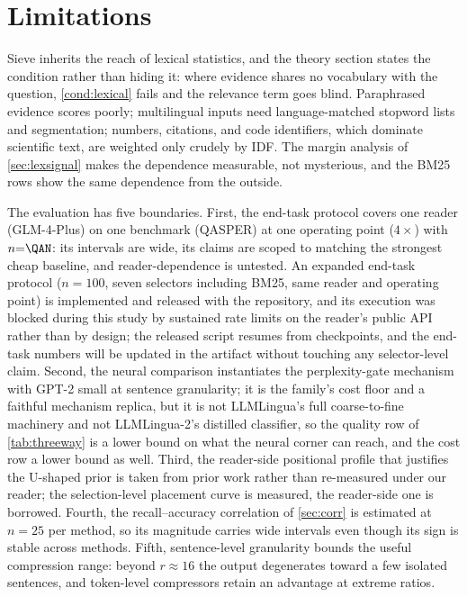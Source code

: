 \documentclass[review,12pt]{elsarticle}
\theoremstyle{remark}
\newcommand{\method}{Sieve}
\begin{document}
\section{Limitations}
\label{sec:limitations}
\method{} inherits the reach of lexical statistics, and the theory
section states the condition rather than hiding it: where evidence
shares no vocabulary with the question, \autoref{cond:lexical} fails
and the relevance term goes blind. Paraphrased evidence scores poorly;
multilingual inputs need language-matched stopword lists and
segmentation; numbers, citations, and code identifiers, which
dominate scientific text, are weighted only crudely by IDF. The
margin analysis of \autoref{sec:lexsignal} makes the dependence
measurable, not mysterious, and the BM25 rows show the same
dependence from the outside.

The evaluation has five boundaries. First, the end-task protocol
covers one reader (GLM-4-Plus) on one benchmark (QASPER) at one
operating point ($4\times$) with $n{=}\QAN$: its intervals are wide, its
claims are scoped to matching the strongest cheap baseline, and
reader-dependence is untested. An expanded end-task protocol
($n=100$, seven selectors including BM25, same reader and operating
point) is implemented and released with the repository, and its
execution was blocked during this study by sustained rate limits on
the reader's public API rather than by design; the released script
resumes from checkpoints, and the end-task numbers will be updated in
the artifact without touching any selector-level claim. Second, the
neural comparison instantiates the perplexity-gate mechanism with
GPT-2 small at sentence granularity; it is the family's cost floor
and a faithful mechanism replica, but it is not LLMLingua's full
coarse-to-fine machinery and not LLMLingua-2's distilled classifier,
so the quality row of \autoref{tab:threeway} is a lower bound on what
the neural corner can reach, and the cost row a lower bound as well.
Third, the reader-side positional profile that justifies the U-shaped
prior is taken from prior work \citep{liu2023lost} rather than
re-measured under our reader; the selection-level placement curve is
measured, the reader-side one is borrowed. Fourth, the
recall--accuracy correlation of \autoref{sec:corr} is estimated at
$n=25$ per method, so its magnitude carries wide intervals even
though its sign is stable across methods. Fifth, sentence-level
granularity bounds the useful compression range: beyond
$r \approx 16$ the output degenerates toward a few isolated
sentences, and token-level compressors retain an advantage at extreme
ratios.
\end{document}
